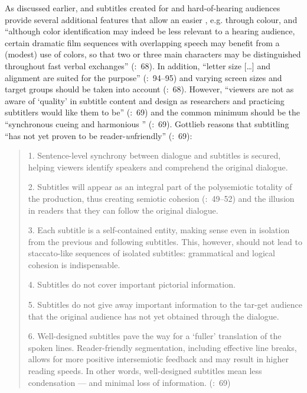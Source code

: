 As discussed earlier,  and  subtitles created for  and hard-of-hearing audiences provide several additional features that allow an easier , e.g. through colour, and “although color identification may indeed be less relevant to a hearing audience, certain dramatic film sequences with overlapping speech may benefit from a (modest) use of colors, so that two or three main characters may be distinguished throughout fast verbal exchanges” (\citealt{Gottlieb2012}:~68). In addition, “letter size […] and alignment are suited for the purpose” (\citealt{neves2007}:~94--95) and varying screen sizes and target groups should be taken into account (\citealt{Gottlieb2012}:~68). However, “viewers are not as aware of ‘quality’ in subtitle content and design as researchers and practicing subtitlers would like them to be” (\citealt{Gottlieb2012}:~69) and the common minimum should be the “synchronous cueing and harmonious ” (\citeyear{Gottlieb2012}:~69). Gottlieb reasons that subtitling “has not yet proven to be reader-\textit{un}friendly” (\citeyear{Gottlieb2012}:~69):
\begin{quote}
1.  Sentence-level synchrony between dialogue and subtitles is secured, helping viewers identify speakers and comprehend the original dialogue.

2.  Subtitles will appear as an integral part of the polysemiotic totality of the production, thus creating semiotic cohesion (\citealt{Diaz_cintas2007}:~49--52) and the illusion in readers that they can follow the original dialogue.

3.  Each subtitle is a self-contained entity, making sense even in isolation from the previous and following subtitles. This, however, should not lead to staccato-like sequences of isolated subtitles: grammatical and logical cohesion is indispensable.

4.  Subtitles do not cover important pictorial information.

5.  Subtitles do not give away important information to the tar-get audience that the original audience has not yet obtained through the dialogue.

6.  Well-designed subtitles pave the way for a ‘fuller’ translation of the spoken lines. Reader-friendly segmentation, including effective line breaks, allows for more positive intersemiotic feedback and may result in higher reading speeds. In other words, well-designed subtitles mean less condensation — and minimal loss of information. (\citealt{Gottlieb2012}:~69)
\end{quote}
